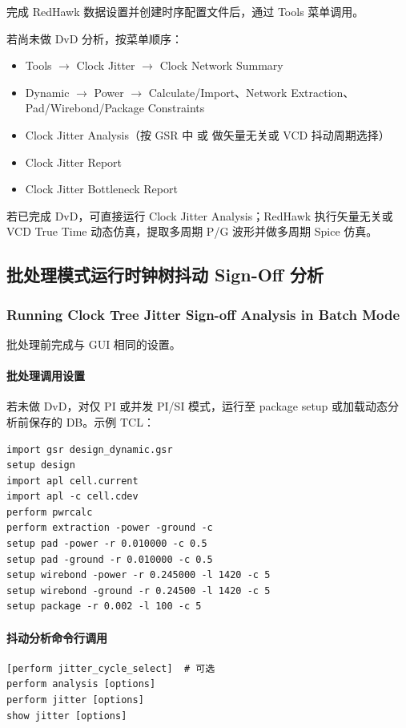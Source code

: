 完成 RedHawk 数据设置并创建时序配置文件后，通过 Tools 菜单调用。

若尚未做 DvD 分析，按菜单顺序：
\begin{itemize}
  \item Tools $\rightarrow$ Clock Jitter $\rightarrow$ Clock Network Summary
  \item Dynamic $\rightarrow$ Power $\rightarrow$ Calculate/Import、Network Extraction、Pad/Wirebond/Package Constraints
  \item Clock Jitter Analysis（按 GSR 中  或  做矢量无关或 VCD 抖动周期选择）
  \item Clock Jitter Report
  \item Clock Jitter Bottleneck Report
\end{itemize}

若已完成 DvD，可直接运行 Clock Jitter Analysis；RedHawk 执行矢量无关或 VCD True Time 动态仿真，提取多周期 P/G 波形并做多周期 Spice 仿真。

\subsection{批处理模式运行时钟树抖动 Sign-Off 分析}
\subsubsection*{Running Clock Tree Jitter Sign-off Analysis in Batch Mode}

批处理前完成与 GUI 相同的设置。

\paragraph{批处理调用设置}
若未做 DvD，对仅 PI 或并发 PI/SI 模式，运行至 package setup 或加载动态分析前保存的 DB。示例 TCL：
\begin{lstlisting}
import gsr design_dynamic.gsr
setup design
import apl cell.current
import apl -c cell.cdev
perform pwrcalc
perform extraction -power -ground -c
setup pad -power -r 0.010000 -c 0.5
setup pad -ground -r 0.010000 -c 0.5
setup wirebond -power -r 0.245000 -l 1420 -c 5
setup wirebond -ground -r 0.24500 -l 1420 -c 5
setup package -r 0.002 -l 100 -c 5
\end{lstlisting}

\paragraph{抖动分析命令行调用}
\begin{lstlisting}
[perform jitter_cycle_select]  # 可选
perform analysis [options]
perform jitter [options]
show jitter [options]
\end{lstlisting}

